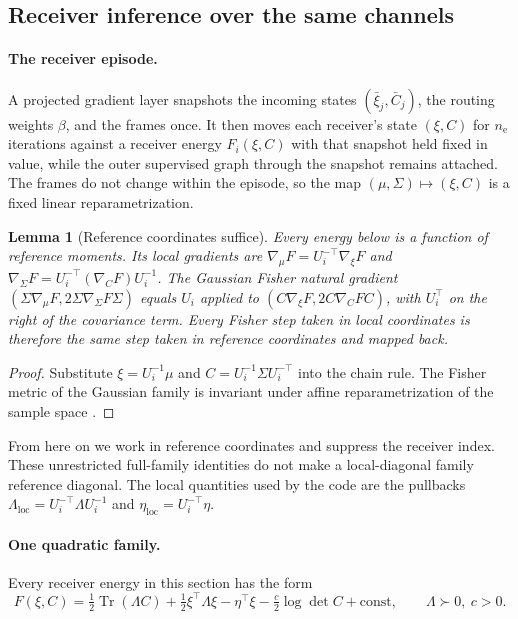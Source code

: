 \documentclass[11pt]{article}
\newtheorem{lemma}[theorem]{Lemma}
\theoremstyle{definition}
\theoremstyle{remark}
\providecommand{\Tr}{\operatorname{Tr}}
\begin{document}
\subsection{Receiver inference over the same channels}
\label{inference:g}
\paragraph{The receiver episode.}
A projected gradient layer snapshots the incoming states $(\bar\xi_j,\bar C_j)$, the routing weights $\beta$, and the frames once. It then moves each receiver's state $(\xi,C)$ for $n_{\mathrm e}$ iterations against a receiver energy $F_i(\xi,C)$ with that snapshot held fixed in value, while the outer supervised graph through the snapshot remains attached. The frames do not change within the episode, so the map $(\mu,\Sigma)\mapsto(\xi,C)$ is a fixed linear reparametrization.

\begin{lemma}[Reference coordinates suffice]
\label{inference:g:lem:reference}
Every energy below is a function of reference moments. Its local gradients are $\nabla_\mu F=U_i^{-\top}\nabla_\xi F$ and $\nabla_\Sigma F=U_i^{-\top}(\nabla_CF)U_i^{-1}$. The Gaussian Fisher natural gradient $(\Sigma\nabla_\mu F,2\Sigma\nabla_\Sigma F\Sigma)$ equals $U_i$ applied to $(C\nabla_\xi F,2C\nabla_CF C)$, with $U_i^\top$ on the right of the covariance term. Every Fisher step taken in local coordinates is therefore the same step taken in reference coordinates and mapped back.
\end{lemma}

\begin{proof}
Substitute $\xi=U_i^{-1}\mu$ and $C=U_i^{-1}\Sigma U_i^{-\top}$ into the chain rule. The Fisher metric of the Gaussian family is invariant under affine reparametrization of the sample space \citep{frame:Amari1998}.
\end{proof}

From here on we work in reference coordinates and suppress the receiver index. These unrestricted full-family identities do not make a local-diagonal family reference diagonal. The local quantities used by the code are the pullbacks $\Lambda_{\mathrm{loc}}=U_i^{-\top}\Lambda U_i^{-1}$ and $\eta_{\mathrm{loc}}=U_i^{-\top}\eta$.

\paragraph{One quadratic family.}
Every receiver energy in this section has the form
\begin{equation}
F(\xi,C)=\tfrac12\Tr(\Lambda C)+\tfrac12\xi^\top\Lambda\xi-\eta^\top\xi-\tfrac{c}{2}\log\det C+\text{const},
\qquad \Lambda\succ0,\ c>0.
\label{inference:g:eq:quadratic_family}
\end{equation}
\end{document}
